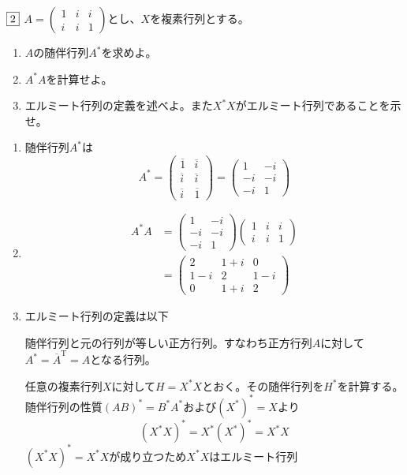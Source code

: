 \documentclass[dvipdfmx]{jsreport}
\renewcommand{\bar}[1]{\overline{#1}} %
\newcounter{num}[section]
\begin{document}
\begin{tcolorbox} %
	$\fbox{2}$ $A= \begin{pmatrix}1& i& i\\ i& i& 1\end{pmatrix}$とし、$X$を複素行列とする。
\begin{enumerate}
	\item $A$の随伴行列$A^{*}$を求めよ。
	\item $A^{*}A$を計算せよ。
	\item エルミート行列の定義を述べよ。また$X^{*}X$がエルミート行列であることを示せ。
\end{enumerate}
\end{tcolorbox}

\begin{answer} %
\begin{enumerate}
	\item 随伴行列$A^{*}$は
\begin{equation*}
	A^{*}= 
\begin{pmatrix}
	\bar{1}& \bar{i}\\
	\bar{i}& \bar{i}\\
	\bar{i}& \bar{1}
\end{pmatrix}
	=
\begin{pmatrix}
	1& -i\\
	-i& -i\\
	-i& 1
\end{pmatrix}
\end{equation*}
	\item
\begin{align*}
	A^{*}A
	&=
\begin{pmatrix}
	1& -i\\
	-i& -i\\
	-i& 1
\end{pmatrix}
\begin{pmatrix}
	1& i& i\\
	i& i& 1
\end{pmatrix}\\
	&= 
\begin{pmatrix}
	2& 1+ i& 0\\
	1- i& 2& 1- i\\
	0& 1+ i& 2
\end{pmatrix}
\end{align*}
	\item エルミート行列の定義は以下
\begin{tcolorbox}
	随伴行列と元の行列が等しい正方行列。すなわち正方行列$A$に対して$A^*= \bar{A}^\mathrm{T}= A$となる行列。
\end{tcolorbox}
	任意の複素行列$X$に対して$H= X^*X$とおく。その随伴行列を$H^*$を計算する。随伴行列の性質$(AB)^*= B^*A^*$および$(X^*)^*= X$より
\begin{equation*}
	(X^*X)^*= X^*(X^*)^*= X^*X
\end{equation*}
	$(X^*X)^*= X^*X$が成り立つため$X^*X$はエルミート行列

\end{enumerate}
\end{answer}
\end{document}
